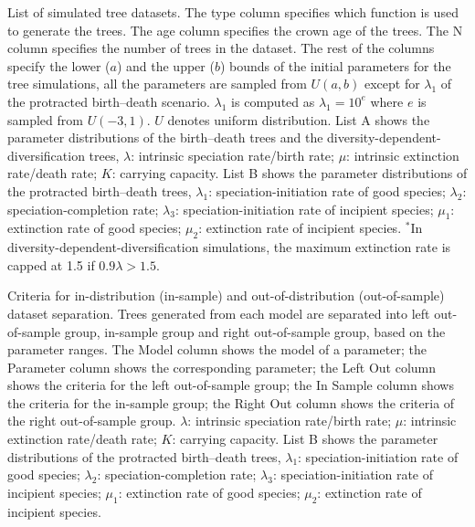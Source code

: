 {\begin{table}[ht]
    \caption{List of simulated tree datasets. The type column specifies which function is used to generate the trees. The age column specifies the crown age of the trees. The N column specifies the number of trees in the dataset. The rest of the columns specify the lower ($a$) and the upper ($b$) bounds of the initial parameters for the tree simulations, all the parameters are sampled from $U(a, b)$ except for $\lambda_1$ of the protracted birth--death scenario. $\lambda_1$ is computed as $\lambda_1 = 10^e$ where $e$ is sampled from $U(-3, 1)$. $U$ denotes uniform distribution. List A shows the parameter distributions of the birth--death trees and the diversity-dependent-diversification trees, $\lambda$: intrinsic speciation rate/birth rate; $\mu$: intrinsic extinction rate/death rate; $K$: carrying capacity. List B shows the parameter distributions of the protracted birth--death trees, $\lambda_1$: speciation-initiation rate of good species; $\lambda_2$: speciation-completion rate; $\lambda_3$: speciation-initiation rate of incipient species; $\mu_1$: extinction rate of good species; $\mu_2$: extinction rate of incipient species. $^*$In diversity-dependent-diversification simulations, the maximum extinction rate is capped at 1.5 if $0.9\lambda > 1.5$.}
    
    \label{table::simulated_trees_in_out_sample}
\end{table}

\begin{table}[ht]
    \caption{Criteria for in-distribution (in-sample) and out-of-distribution (out-of-sample) dataset separation. Trees generated from each model are separated into left out-of-sample group, in-sample group and right out-of-sample group, based on the parameter ranges. The Model column shows the model of a parameter; the Parameter column shows the corresponding parameter; the Left Out column shows the criteria for the left out-of-sample group; the In Sample column shows the criteria for the in-sample group; the Right Out column shows the criteria of the right out-of-sample group. $\lambda$: intrinsic speciation rate/birth rate; $\mu$: intrinsic extinction rate/death rate; $K$: carrying capacity. List B shows the parameter distributions of the protracted birth--death trees, $\lambda_1$: speciation-initiation rate of good species; $\lambda_2$: speciation-completion rate; $\lambda_3$: speciation-initiation rate of incipient species; $\mu_1$: extinction rate of good species; $\mu_2$: extinction rate of incipient species.}
    
    \label{table::simulation_in_out_sample}
\end{table}

}
